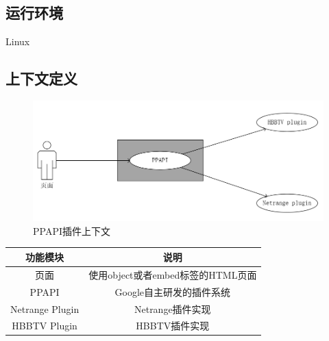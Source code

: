\subsection{运行环境}
Linux

\subsection{上下文定义}
\begin{figure}[H] 
  \centering 
  \includegraphics[width=\textwidth]{image/ppapi/use_case.jpg} 
  \caption{PPAPI插件上下文} 
\end{figure}

\vspace{10ex}
\begin{center}
\begin{tabular}{|c|c|}
\hline
功能模块 & 说明 \\
\hline  
页面 & 使用object或者embed标签的HTML页面 \\
\hline
PPAPI & Google自主研发的插件系统 \\
\hline
Netrange Plugin & Netrange插件实现 \\
\hline
HBBTV Plugin & HBBTV插件实现 \\
\hline
\end{tabular}
\end{center}

